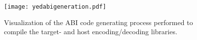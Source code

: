 
\begin{figure}
\centering

\texttt{[image: yedabigeneration.pdf]}

\caption[The ABI code generation process]{Visualization of the ABI code generating process performed to compile the target- and host encoding/decoding libraries.}
\label{fig:abigeneration}

\end{figure}